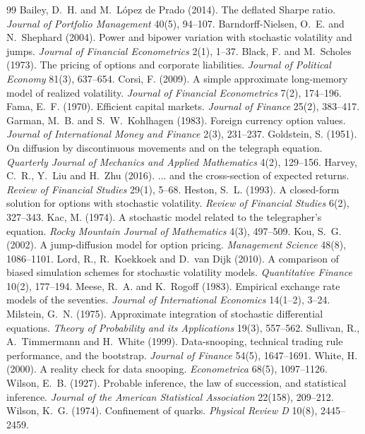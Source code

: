 \documentclass[11pt]{article}
\begin{document}
\begin{thebibliography}{99}
\small
\setlength{\itemsep}{0pt}\setlength{\parsep}{0pt}\setlength{\parskip}{0pt}
 Bailey, D.~H. and M.~L\'opez de Prado (2014).
  The deflated Sharpe ratio. \emph{Journal of Portfolio Management} 40(5), 94--107.
 Barndorff-Nielsen, O.~E. and N.~Shephard (2004).
  Power and bipower variation with stochastic volatility and jumps.
  \emph{Journal of Financial Econometrics} 2(1), 1--37.
 Black, F. and M.~Scholes (1973). The pricing of options and
  corporate liabilities. \emph{Journal of Political Economy} 81(3), 637--654.
 Corsi, F. (2009). A simple approximate long-memory model
  of realized volatility. \emph{Journal of Financial Econometrics} 7(2), 174--196.
 Fama, E.~F. (1970). Efficient capital markets.
  \emph{Journal of Finance} 25(2), 383--417.
 Garman, M.~B. and S.~W.~Kohlhagen (1983). Foreign currency
  option values. \emph{Journal of International Money and Finance} 2(3), 231--237.
 Goldstein, S. (1951). On diffusion by discontinuous
  movements and on the telegraph equation. \emph{Quarterly Journal of
  Mechanics and Applied Mathematics} 4(2), 129--156.
 Harvey, C.~R., Y.~Liu and H.~Zhu (2016).
  $\ldots$ and the cross-section of expected returns.
  \emph{Review of Financial Studies} 29(1), 5--68.
 Heston, S.~L. (1993). A closed-form solution for options
  with stochastic volatility. \emph{Review of Financial Studies} 6(2), 327--343.
 Kac, M. (1974). A stochastic model related to the telegrapher's
  equation. \emph{Rocky Mountain Journal of Mathematics} 4(3), 497--509.
 Kou, S.~G. (2002). A jump-diffusion model for option pricing.
  \emph{Management Science} 48(8), 1086--1101.
 Lord, R., R.~Koekkoek and D.~van Dijk (2010). A comparison of
  biased simulation schemes for stochastic volatility models.
  \emph{Quantitative Finance} 10(2), 177--194.
 Meese, R.~A. and K.~Rogoff (1983). Empirical exchange rate
  models of the seventies. \emph{Journal of International Economics} 14(1--2), 3--24.
 Milstein, G.~N. (1975). Approximate integration of
  stochastic differential equations. \emph{Theory of Probability and its
  Applications} 19(3), 557--562.
 Sullivan, R., A.~Timmermann and H.~White (1999). Data-snooping,
  technical trading rule performance, and the bootstrap.
  \emph{Journal of Finance} 54(5), 1647--1691.
 White, H. (2000). A reality check for data snooping.
  \emph{Econometrica} 68(5), 1097--1126.
 Wilson, E.~B. (1927). Probable inference, the law of
  succession, and statistical inference. \emph{Journal of the American
  Statistical Association} 22(158), 209--212.
 Wilson, K.~G. (1974). Confinement of quarks.
  \emph{Physical Review D} 10(8), 2445--2459.
\end{thebibliography}
\end{document}
